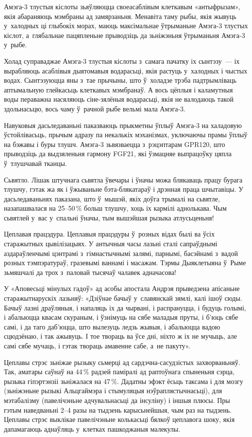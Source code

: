 Амэга-3 тлустыя кіслоты зьяўляюцца своеасаблівым клеткавым «антыфрызам», якія абараняюць мэмбраны ад замярзаньня. Менавіта таму рыбы, якія жывуць у~халодных ці глыбокіх морах, маюць максімальнае ўтрыманьне Амэга-3 тлустых кіслот, а~глябальнае пацяпленьне прыводзіць да зьніжэньня ўтрыманьня Амэга-3 у~рыбе.

Холад суправаджае Амэга-3 тлустыя кіслоты з~самага пачатку іх сынтэзу~--- іх вырабляюць асаблівыя дыятомавыя водарасьці, якія растуць у~халодных і чыстых водах. Сынтэзуюцца яны з~тае прычыны, што ў~холадзе трэба падтрымліваць аптымальную глейкасьць клеткавых мэмбранаў. А вось цёплыя і каламутныя воды пераважна насяляюць сіне-зялёныя водарасьці, якія не валодаюць такой здольнасьцю, вось чаму ў~рачной рыбе вельмі мала Амэга-3.

Навуковыя дасьледаваньні паказваюць прыкметны ўплыў Амэга-3 на халадовую ўстойлівасьць, прычым адразу па некалькіх мэханізмах, уключаючы прамы ўплыў на бэжавы і буры тлушч. Амэга-3 зьвязваецца з~рэцэптарам GPR120, што прыводзіць да выдзяленьня гармону FGF21, які ўзмацняе выпрацоўку цяпла ў~тлушчавай тканцы.

Сьвятло. Лішак штучнага сьвятла ўвечары і ўначы можа блякаваць працу бурага тлушчу, гэтак жа як і ўжываньне бэта-блякатараў і дрэнная праца шчытавіцы. У дасьледаваньнях паказана, што ў~мышэй, якіх доўга трымалі на сьвятле, назапашвалася на 25--50\,\% больш тлушчу, хоць іх кармілі аднолькава. Чым сьвятлей у~вас у~спальні ўначы, тым вышэйшая рызыка атлусьценьня!

Цеплавая працэдура. Цеплавыя працэдуры ў~розных відах былі ва ўсіх старажытных цывілізацыях. У антычныя часы лазьні сталі сапраўднымі аздараўленчымі цэнтрамі з~гімнастычнымі залямі, парнымі, басэйнамі з~вадой розных тэмпэратураў, гразевымі ваннамі і масажам. Тэрмы Дыяклетыяна ў~Рыме зьмяшчалі да трох з~паловай тысячаў чалавек адначасова!

У «Аповесьці мінулых гадоў» ад асобы апостала Андрэя прыведзена апісаньне старажытнарускіх лазьняў: «Дзіўнае бачыў у~славянскай зямлі, калі ішоў сюды. Бачыў лазні драўляныя, і напаляць іх да чырвані, і распрануцца, і будуць голымі, і абальюцца квасам скураным, і ўзнімуць на сябе маладыя пруты, і б’юць сябе самі, і да таго даб’юцца, што вылезуць ледзь жывыя, і абальюцца вадою сцюдзёнаю, і так ажывуць. І тое твораць ва ўсе дні, ніхто ж іх не мучыць, але самі сябе мучаць, і гэтак твораць амавенне сабе, а~не пакуту».

Цеплавы стрэс зьніжае рызыку сьмерці ад сардэчна-сасудзістых захворваньняў. Так, аматары саўнаў на 44\,\% радзей паміралі ад раптоўнага спыненьня сэрца, рызыка гіпэртэнзіі зьніжалася на 47\,\%. Дадатны эфэкт ёсьць таксама і для мозгу (зьніжэньне рызыкі Альцгаймэра і стымуляцыя нэўраплястычнасьці), для мэтабалізму (павелічэньне адчувальнасьці да інсуліну) і іншыя плюсы. Пры гэтым наведваньні 2--4 разы на тыдзень карысьнейшыя, чым раз на тыдзень. Цеплавы стрэс выклікае павелічэньне колькасьці бялкоў цеплавога шоку, якія дапамагаюць аднаўляць у~клетках пашкоджаныя малекулы.

